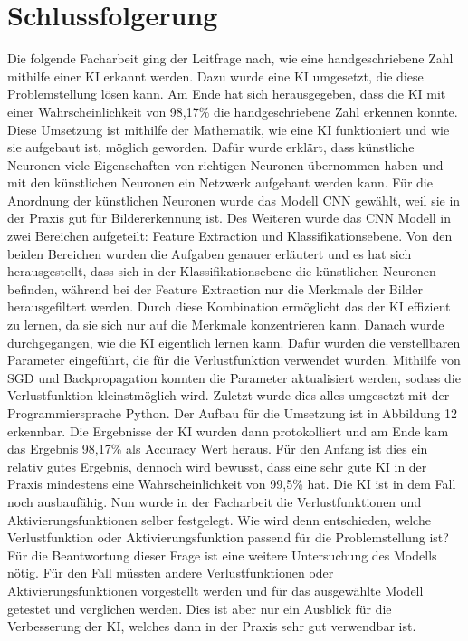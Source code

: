 \documentclass[11pt]{article}
\begin{document}
\section{Schlussfolgerung}
Die folgende Facharbeit ging der Leitfrage nach, wie eine handgeschriebene Zahl mithilfe einer KI erkannt werden. Dazu wurde eine KI umgesetzt, die diese Problemstellung lösen kann.
Am Ende hat sich herausgegeben, dass die KI mit einer Wahrscheinlichkeit von 98,17\% die handgeschriebene Zahl erkennen konnte. Diese Umsetzung ist mithilfe der Mathematik, wie
eine KI funktioniert und wie sie aufgebaut ist, möglich geworden. Dafür wurde erklärt, dass künstliche Neuronen viele Eigenschaften von richtigen Neuronen übernommen haben und mit den
künstlichen Neuronen ein Netzwerk aufgebaut werden kann. Für die Anordnung der künstlichen Neuronen wurde das Modell CNN gewählt, weil sie in der Praxis gut für
Bildererkennung ist. Des Weiteren wurde das CNN Modell in zwei Bereichen
aufgeteilt: Feature Extraction und Klassifikationsebene. Von den beiden Bereichen wurden die Aufgaben genauer erläutert und es hat sich herausgestellt, dass sich in der
Klassifikationsebene die künstlichen Neuronen befinden, während bei der Feature Extraction nur die Merkmale der Bilder herausgefiltert werden. Durch diese Kombination ermöglicht das der KI
effizient zu lernen, da sie sich nur auf die Merkmale konzentrieren kann. Danach wurde durchgegangen, wie die KI eigentlich lernen kann. Dafür wurden die verstellbaren Parameter
eingeführt, die für die Verlustfunktion verwendet wurden. Mithilfe von SGD und Backpropagation konnten die Parameter aktualisiert werden, sodass die Verlustfunktion kleinstmöglich
wird. Zuletzt wurde dies alles umgesetzt mit der Programmiersprache Python. Der Aufbau für die Umsetzung ist in Abbildung 12 erkennbar. Die Ergebnisse der KI wurden
dann protokolliert und am Ende kam das Ergebnis 98,17\% als Accuracy Wert heraus. Für den Anfang ist dies ein relativ gutes Ergebnis,
dennoch wird bewusst, dass eine sehr gute KI in der Praxis mindestens eine Wahrscheinlichkeit von 99,5\% hat. Die KI ist in dem Fall noch ausbaufähig.
\newline
\newline
Nun wurde in der Facharbeit die Verlustfunktionen und Aktivierungsfunktionen selber festgelegt. Wie wird
denn entschieden, welche Verlustfunktion oder Aktivierungsfunktion passend für die Problemstellung ist?
Für die Beantwortung dieser Frage ist eine weitere Untersuchung des Modells nötig. Für den Fall müssten andere Verlustfunktionen
oder Aktivierungsfunktionen vorgestellt werden und für das ausgewählte Modell getestet und verglichen werden.
Dies ist aber nur ein Ausblick für die Verbesserung der KI, welches dann in der Praxis sehr gut verwendbar ist.
\end{document}
